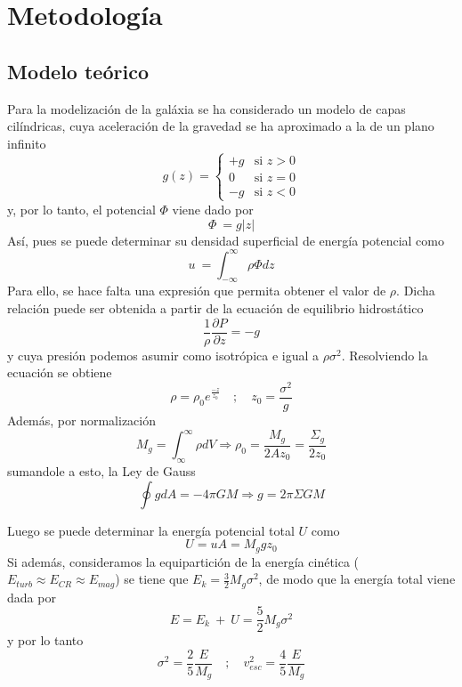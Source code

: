 \section{Metodología}

\subsection{Modelo teórico}
Para la modelización de la galáxia se ha considerado un modelo de capas cilíndricas, cuya aceleración de la gravedad se ha aproximado a la de un plano infinito
\begin{equation}
    g(z) = 
    \begin{cases} 
        +g & \text{si } z > 0 \\
        0  & \text{si } z = 0 \\
        -g & \text{si } z < 0 
    \end{cases}
\end{equation}
y, por lo tanto, el potencial $\Phi$ viene dado por
\begin{equation}
	\Phi \ = g |z|
\end{equation}
Así, pues se puede determinar su densidad superficial de energía potencial como
\begin{equation}
	u \ = \int_{-\infty}^{\infty} \rho \Phi dz
\end{equation}
Para ello, se hace falta una expresión que permita obtener el valor de $\rho$. Dicha relación puede ser obtenida a partir de la ecuación de equilibrio hidrostático
\begin{equation}
	\frac{1}{\rho}\frac{\partial P}{\partial z} = -g
\end{equation}
y cuya presión podemos asumir como isotrópica e igual a $\rho \sigma^2$. Resolviendo la ecuación se obtiene
\begin{equation}
	\rho = \rho_0 e^{\frac{-z}{z_0}} \quad ; \quad z_0 = \frac{\sigma^2}{g}
\end{equation}
Además, por normalización
\begin{equation}
	M_g = \int_{\infty}^{\infty}\rho dV \Rightarrow \rho_0 = \frac{M_g}{2Az_0} = \frac{\Sigma_g}{2z_0}
\end{equation}
sumandole a esto, la Ley de Gauss
\begin{equation}
	\oint gdA = -4\pi GM \Rightarrow g = 2\pi \Sigma G M
\end{equation}

Luego se puede determinar la energía potencial total $U$ como 
\begin{equation}
	U = uA = M_g g z_0
\end{equation}
Si además, consideramos la equipartición de la energía cinética ($E_{turb} \approx E_{CR} \approx E_{mag}$) se tiene que $E_k = \frac{3}{2}M_g \sigma^2$, de modo que la energía total viene dada por
\begin{equation}
	E = E_k \ + \ U = \frac{5}{2} M_g \sigma^2
\end{equation}
y por lo tanto
\begin{equation}
	\sigma^2 = \frac{2}{5}\frac{E}{M_g} \quad ; \quad v_{esc}^2 = \frac{4}{5} \frac{E}{M_g}
\end{equation}


